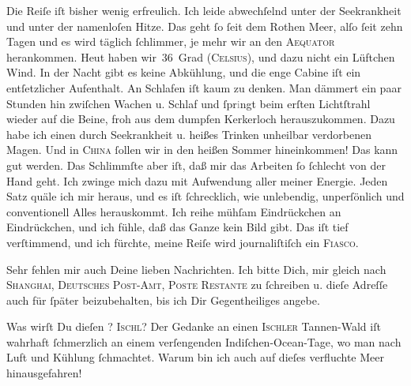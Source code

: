 \pstart
           Die Reiſe iſt bisher wenig erfreulich. Ich leide abwechſelnd unter der Seekrankheit
               und unter der namenloſen Hitze. Das geht ſo ſeit dem Rothen Meer, alſo ſeit zehn Tagen {\pb}und es wird täglich ſchlimmer, je mehr wir an den
                  \textsc{Aequator} herankommen. Heut haben wir 36 Grad (\textsc{Celsius}), und dazu nicht
               ein Lüftchen Wind. In der Nacht gibt es keine Abkühlung, und die enge Cabine iſt ein
               entſetzlicher Aufenthalt. An Schlafen iſt kaum zu denken. Man dämmert ein paar
               Stunden hin zwiſchen Wachen u. Schlaf und ſpr\textcolor{gray}{i}ngt beim erſten
               Lichtſtrahl wieder auf die Beine, froh aus {\pb}dem
               dumpfen Kerkerloch herauszukommen. Dazu habe ich einen \strikeout{\textcolor{gray}{du}} durch Seekrankheit u. heißes Trinken unheilbar verdorbenen Magen. Und in \textsc{China} ſollen wir in den heißen Sommer hineinkommen! Das kann gut werden. Das
               Schlimmſte aber iſt, daß mir das Arbeiten ſo ſchlecht von der Hand geht. Ich zwinge
               mich dazu mit Aufwendung aller meiner Energie. {\pb}Jeden Satz quäle ich mir heraus, und es iſt ſchrecklich, wie unlebendig,
               unperſönlich und conventionell Alles herauskommt. Ich reihe mühſam Eindrückchen an
               Eindrückchen, und ich fühle, daß das Ganze kein Bild gibt. Das iſt tief verſtimmend,
               und ich fürchte, meine Reiſe wird journaliſtiſch ein \textsc{Fiasco}.\pend
           
\pstart
           Sehr fehlen mir auch Deine lieben Nachrichten. Ich bitte Dich, mir gleich {\pb}nach \textsc{Shanghai}, \textsc{Deutsches Post-Amt, Poste Restante} zu
               ſchreiben u. dieſe Adreſſe auch für ſpäter beizubehalten, bis ich Dir Gegentheiliges
               angebe.\pend
           
\pstart
           Was wirſt Du dieſen \label{K_L02846-1v}\label{K_L02846-1}? \textsc{Ischl}? Der Gedanke an einen \textsc{Ischler} Tannen-Wald  iſt {\pb}wahrhaft ſchmerzlich an einem verſengenden
                  Indiſchen-Ocean-Tage, wo man nach Luft und
               Kühlung ſchmachtet. Warum bin ich auch auf dieſes verfluchte Meer hinausgefahren!\pend
           

